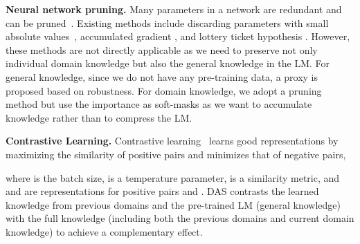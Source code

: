 \documentclass{article} \usepackage{iclr2023_conference,times}
\begin{document}
\noindent
\textbf{Neural network pruning.}
Many parameters in a network are redundant and can be pruned~\citep{li2021differentiable,lai2021parp,michel2019sixteen,voita2019analyzing}. 
Existing methods include discarding parameters with small absolute values~\citep{han2015learning,guo2016dynamic}, accumulated gradient \citep{michel2019sixteen}, and lottery ticket hypothesis \citep{brix-etal-2020-successfully}. However, these methods are not directly applicable as  we need to preserve not only individual domain knowledge but also the general knowledge in the LM. For general knowledge, since we do not have any pre-training data, a proxy is proposed based on robustness.  For domain knowledge, we adopt a pruning method but use the importance as soft-masks as we want to accumulate knowledge rather than to compress the LM. 


\textbf{Contrastive Learning.} 
Contrastive learning~\citep{chen2020simple,he2020momentum} learns good representations by maximizing the similarity of positive pairs and minimizes that of negative pairs, {\color{black}

}
where  is the batch size,  is a temperature parameter,  is a similarity metric, and  and  are representations for positive pairs  and . DAS contrasts the learned knowledge from previous domains and the pre-trained LM (general knowledge) with the full knowledge (including both the previous domains and current domain knowledge) to achieve a complementary effect. 
\end{document}

